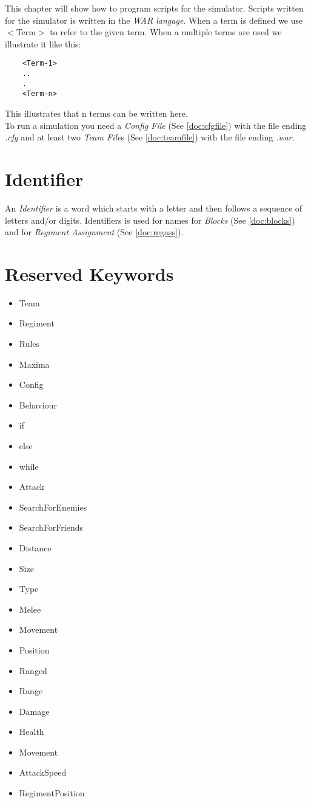 This chapter will show how to program scripts for the simulator. Scripts written for the simulator is written in the {\it WAR langage}. 
When a term is defined we use $<$Term$>$ to refer to the given term. 
When a multiple terms are used we illustrate it like this: \\
\begin{verbatim}
	<Term-1>
	..
	.
	<Term-n>
\end{verbatim}
This illustrates that n terms can be written here. \\

To run a simulation you need a {\it Config File} (See \ref{doc:cfgfile}) with the file ending {\it .cfg} and at least two {\it Team File}s 
(See \ref{doc:teamfile}) with the file ending {\it .war}.

\section{Identifier}
	An {\it Identifier} is a word which starts with a letter and then follows a sequence of letters and/or digits.
	Identifiers is used for names for {\it Blocks} (See \ref{doc:blocks}) and for {\it Regiment Assignment} (See \ref{doc:regass}).
\section{Reserved Keywords}
	\begin{itemize}
		\item Team
		\item Regiment
		\item Rules
		\item Maxima
		\item Config
		\item Behaviour
		\item if
		\item else
		\item while
		\item Attack
		\item SearchForEnemies
		\item SearchForFriends
		\item Distance
		\item Size
		\item Type 
		\item Melee
		\item Movement
		\item Position
		\item Ranged
		\item Range
		\item Damage
		\item Health
		\item Movement
		\item AttackSpeed
		\item RegimentPosition
	\end{itemize}
